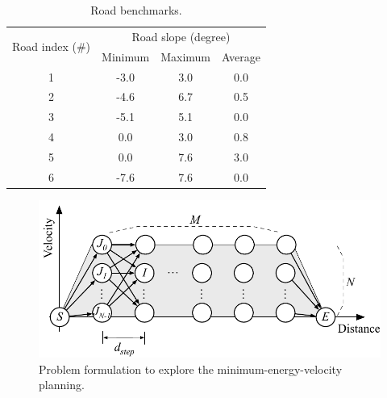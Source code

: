 \documentclass{IEEEtran}
\begin{document}
\begin{table} 
\caption{Road benchmarks.}
\centering
\label{table:road_bench}
\begin{tabular}{|c|c|c|c|}  \hline
\multirow{2}{*}{Road index (\#)}
			&\multicolumn{3}{|c|}{Road slope (degree)}  \\ \cline{2-4}
			&Minimum 	&Maximum 	&Average \\ \hline
1			&-3.0 		&3.0 			&0.0 	  	\\ \hline
2			&-4.6 		&6.7 			&0.5 		\\ \hline
3			&-5.1 		&5.1 			&0.0 		\\ \hline
4			&0.0 			&3.0 			&0.8		\\ \hline
5			&0.0 			&7.6 			&3.0 		\\ \hline
6			&-7.6 		&7.6 			&0.0 		\\ \hline

\end{tabular}
\end{table}

\begin{figure} [h]%
\includegraphics[width=1.0\hsize]{Figures/Opt_drive_problem.pdf}
\caption{Problem formulation to explore the minimum-energy-velocity planning.}
\label{fig:Opt_drive_problem}
\end{figure}
\end{document}
